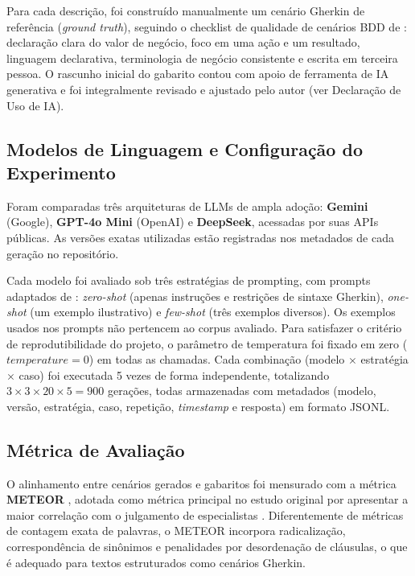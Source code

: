 \documentclass[12pt]{article}
\begin{document}
Para cada descrição, foi construído manualmente um cenário Gherkin de referência (\textit{ground truth}), seguindo o checklist de qualidade de cenários BDD de \cite{oliveira2019}: declaração clara do valor de negócio, foco em uma ação e um resultado, linguagem declarativa, terminologia de negócio consistente e escrita em terceira pessoa. O rascunho inicial do gabarito contou com apoio de ferramenta de IA generativa e foi integralmente revisado e ajustado pelo autor (ver Declaração de Uso de IA).

\subsection{Modelos de Linguagem e Configuração do Experimento}

Foram comparadas três arquiteturas de LLMs de ampla adoção: \textbf{Gemini} (Google), \textbf{GPT-4o Mini} (OpenAI) e \textbf{DeepSeek}, acessadas por suas APIs públicas. As versões exatas utilizadas estão registradas nos metadados de cada geração no repositório.

Cada modelo foi avaliado sob três estratégias de prompting, com prompts adaptados de \cite{fernandes2025}: \textit{zero-shot} (apenas instruções e restrições de sintaxe Gherkin), \textit{one-shot} (um exemplo ilustrativo) e \textit{few-shot} (três exemplos diversos). Os exemplos usados nos prompts não pertencem ao corpus avaliado. Para satisfazer o critério de reprodutibilidade do projeto, o parâmetro de temperatura foi fixado em zero ($temperature=0$) em todas as chamadas. Cada combinação (modelo $\times$ estratégia $\times$ caso) foi executada 5 vezes de forma independente, totalizando $3 \times 3 \times 20 \times 5 = 900$ gerações, todas armazenadas com metadados (modelo, versão, estratégia, caso, repetição, \textit{timestamp} e resposta) em formato JSONL.

\subsection{Métrica de Avaliação}

O alinhamento entre cenários gerados e gabaritos foi mensurado com a métrica \textbf{METEOR} \cite{lavie2009}, adotada como métrica principal no estudo original por apresentar a maior correlação com o julgamento de especialistas \cite{fernandes2025}. Diferentemente de métricas de contagem exata de palavras, o METEOR incorpora radicalização, correspondência de sinônimos e penalidades por desordenação de cláusulas, o que é adequado para textos estruturados como cenários Gherkin.
\end{document}

